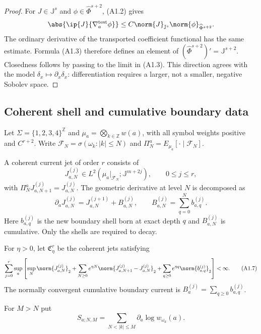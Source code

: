 \begin{proof}
For $J\in\mathbb J^s$ and $\phi\in\widehat\Phi^{s+2}$, (A1.2) gives
\[
 \abs{\ip{J}{\nabla_a^{\rm test}\phi}}
 \le C\norm{J}_{\mathbb J^s}\norm{\phi}_{\widehat\Phi^{s+2}}.
\]
The ordinary derivative of the transported coefficient functional has the
same estimate.  Formula (A1.3) therefore defines an element of
$(\widehat\Phi^{s+2})'=\mathbb J^{s+2}$.  Closedness follows by passing to the
limit in (A1.3).  This direction agrees with the model
$\delta_x\mapsto\partial_x\delta_x$: differentiation requires a larger, not a
smaller, negative Sobolev space.
\end{proof}

\subsection{Coherent shell and cumulative boundary data}

Let $\Sigma=\{1,2,3,4\}^{\mathbb Z}$ and
$\mu_a=\bigotimes_{k\in\mathbb Z}w(a)$, with all symbol weights positive and
$C^{r+2}$.  Write $\mathcal F_N=\sigma(\omega_k:|k|\le N)$ and
$\Pi_N^a=E_{\mu_a}[\cdot\mid\mathcal F_N]$.

A coherent current jet of order $r$ consists of
\[
 J^{(j)}_{a,N}\in L^2(\mu_a|_{\mathcal F_N};\mathbb J^{m+2j}),
 \qquad 0\le j\le r,                                     \tag{A1.5}
\]
with $\Pi_N^aJ^{(j)}_{a,N+1}=J^{(j)}_{a,N}$.  The geometric derivative at
level $N$ is decomposed as
\[
 \partial_aJ^{(j)}_{a,N}=J^{(j+1)}_{a,N}+B^{(j)}_{a,N},
 \qquad B^{(j)}_{a,N}=\sum_{q=0}^{N}b^{(j)}_{a,q}.         \tag{A1.6}
\]
Here $b^{(j)}_{a,q}$ is the new boundary shell born at exact depth $q$ and
$B^{(j)}_{a,N}$ is cumulative.  Only the shells are required to decay.

\begin{definition}
\label{def:r29-a1-domain}
For $\eta>0$, let $\mathfrak C^{r}_{\eta}$ be the coherent jets satisfying
\[
 \sum_{j=0}^{r}\sup_a\left[
   \sup_N\norm{J^{(j)}_{a,N}}_2+
   \sum_{N\ge0}e^{\eta N}
      \norm{J^{(j)}_{a,N+1}-J^{(j)}_{a,N}}_2+
   \sum_{q\ge0}e^{\eta q}\norm{b^{(j)}_{a,q}}_2
 \right]<\infty.                                         \tag{A1.7}
\]
The normally convergent cumulative boundary current is
$B^{(j)}_a=\sum_{q\ge0}b^{(j)}_{a,q}$.
\end{definition}

For $M>N$ put
\[
 S_{a;N,M}=\sum_{N<|k|\le M}\partial_a\log w_{\omega_k}(a).
\]

